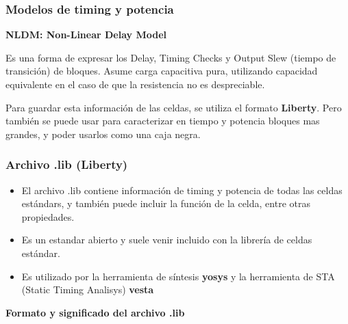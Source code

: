 \documentclass{beamer}
\begin{document}
\begin{frame}
  \frametitle{Modelos de timing y potencia} 

\textbf{NLDM: Non-Linear Delay Model} 

Es una forma de expresar los Delay, Timing Checks y Output Slew (tiempo de transici\'on) de bloques. Asume carga capacitiva pura, utilizando capacidad equivalente en el caso de que la resistencia no es despreciable. 

Para guardar esta información de las celdas, se utiliza el formato \textbf{Liberty}. Pero también se puede usar para caracterizar en tiempo y potencia bloques mas grandes, y poder usarlos como una caja negra.
\end{frame}

\begin{frame}[fragile]
  \frametitle{ Archivo .lib (Liberty)  }
  \begin{itemize}
    \item El archivo .lib contiene información de timing y potencia de todas las celdas estándars, y también puede incluir la función de la celda, entre otras propiedades. 

    \item Es un estandar abierto y suele venir incluido con la librería de celdas estándar.

    \item Es utilizado por la herramienta de síntesis \textbf{yosys} y la herramienta de STA (Static Timing Analisys) \textbf{vesta}
  \end{itemize}
\end{frame}
\begin{frame}
\textbf{Formato y significado del archivo .lib} 
   \begin{figure}[ht]
      \centering
    \end{figure}
\end{frame}
\end{document}
